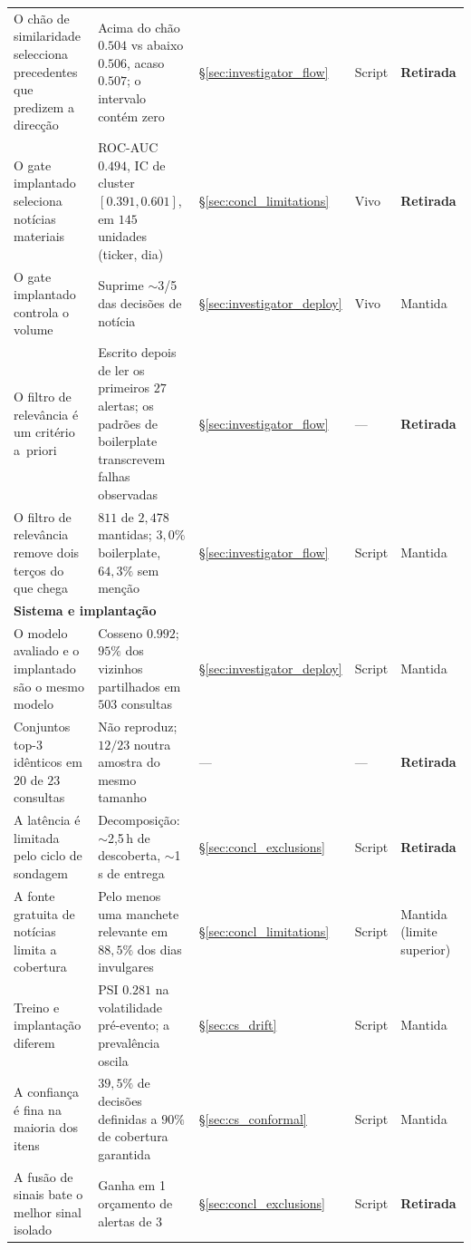 \begin{table}[ht]
\begin{tabular}{p{4.6cm} p{3.5cm} p{1.6cm} p{1.2cm} p{1.7cm}}
O chão de similaridade selecciona precedentes que predizem a direcção & Acima do chão $0.504$ vs abaixo $0.506$, acaso $0.507$; o intervalo contém zero & §\ref{sec:investigator_flow} & Script & \textbf{Retirada} \\
O gate implantado seleciona notícias materiais & ROC-AUC $0.494$, IC de cluster $[0.391, 0.601]$, em $145$ unidades (ticker, dia) & §\ref{sec:concl_limitations} & Vivo & \textbf{Retirada} \\
O gate implantado controla o volume & Suprime $\sim$3/5 das decisões de notícia & §\ref{sec:investigator_deploy} & Vivo & Mantida \\
\midrule
O filtro de relevância é um critério a~priori & Escrito depois de ler os primeiros $27$ alertas; os padrões de boilerplate transcrevem falhas observadas & §\ref{sec:investigator_flow} & --- & \textbf{Retirada} \\
O filtro de relevância remove dois terços do que chega & $811$ de $2{,}478$ mantidas; $3,0\%$ boilerplate, $64,3\%$ sem menção & §\ref{sec:investigator_flow} & Script & Mantida \\
\midrule
\multicolumn{5}{l}{\textbf{Sistema e implantação}} \\
O modelo avaliado e o implantado são o mesmo modelo & Cosseno $0.992$; $95\%$ dos vizinhos partilhados em $503$ consultas & §\ref{sec:investigator_deploy} & Script & Mantida \\
Conjuntos top-3 idênticos em $20$ de $23$ consultas & Não reproduz; $12/23$ noutra amostra do mesmo tamanho & --- & --- & \textbf{Retirada} \\
A latência é limitada pelo ciclo de sondagem & Decomposição: $\sim$2,5\,h de descoberta, $\sim$1\,s de entrega & §\ref{sec:concl_exclusions} & Script & \textbf{Retirada} \\
A fonte gratuita de notícias limita a cobertura & Pelo menos uma manchete relevante em $88,5\%$ dos dias invulgares & §\ref{sec:concl_limitations} & Script & Mantida (limite superior) \\
Treino e implantação diferem & PSI $0.281$ na volatilidade pré-evento; a prevalência oscila & §\ref{sec:cs_drift} & Script & Mantida \\
A confiança é fina na maioria dos itens & $39,5\%$ de decisões definidas a $90\%$ de cobertura garantida & §\ref{sec:cs_conformal} & Script & Mantida \\
A fusão de sinais bate o melhor sinal isolado & Ganha em 1 orçamento de alertas de 3 & §\ref{sec:concl_exclusions} & Script & \textbf{Retirada} \\

\end{tabular}
\end{table}
